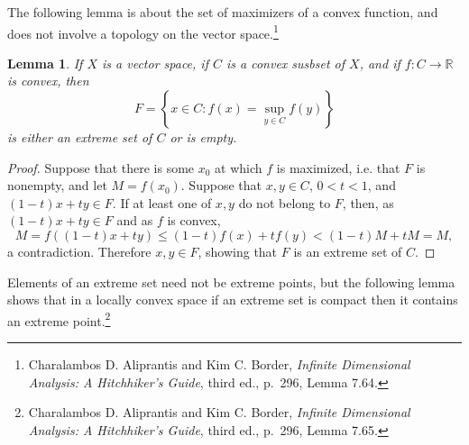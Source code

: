 \documentclass{article}
\newtheorem{lemma}[theorem]{Lemma}
\theoremstyle{definition}
\begin{document}
The following lemma is about the set of maximizers of a convex function, and does not involve a topology on the vector space.\footnote{Charalambos D. Aliprantis and Kim C. Border,
{\em Infinite Dimensional Analysis: A Hitchhiker's Guide}, third ed., p.~296, Lemma 7.64.}

\begin{lemma}
If $X$ is a vector space, if $C$ is a convex susbset of $X$, and if $f:C \to \mathbb{R}$ is  convex, then
\[
F=\left\{x \in C: f(x) = \sup_{y \in C} f(y) \right\}
\]
is either an extreme set of $C$ or is empty.
\label{extremeset}
\end{lemma}
\begin{proof}
Suppose that there is some $x_0$ at which $f$ is maximized, i.e. that $F$ is nonempty, and let $M=f(x_0)$.
Suppose that $x,y \in C$, $0<t<1$, and $(1-t)x+ty \in F$. If at least one of $x,y$ do not belong to $F$, then, as $(1-t)x+ty \in F$ and as $f$ is convex,
\[
M=f((1-t)x+ty) \leq (1-t)f(x)+tf(y) < (1-t) M + tM = M,
\]
a contradiction. Therefore $x,y \in F$, showing that $F$ is an extreme set of $C$.
\end{proof}



Elements of an extreme set need not be extreme points, but the following lemma shows that in a locally convex space if an extreme set
is compact then it contains an extreme point.\footnote{Charalambos D. Aliprantis and Kim C. Border,
{\em Infinite Dimensional Analysis: A Hitchhiker's Guide}, third ed., p.~296, Lemma 7.65.}
\end{document}
